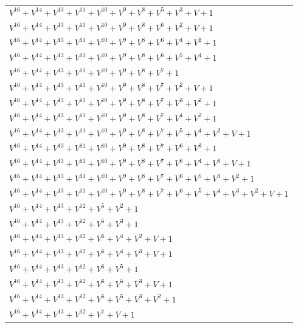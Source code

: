 \documentclass[12pt]{article}
\begin{document}
\begin{adjustwidth}{-4cm}{}
\begin{center}
\begin{longtable}{|l|}
$V^{16}  +V^{14}  +V^{13}  +V^{11}  +V^{10}  +V^{9}  +V^{8}  +V^{5}  +V^{3}  + V + 1$ \\
$V^{16}  +V^{14}  +V^{13}  +V^{11}  +V^{10}  +V^{9}  +V^{8}  +V^{6}  +V^{2}  + V + 1$ \\
$V^{16}  +V^{14}  +V^{13}  +V^{11}  +V^{10}  +V^{9}  +V^{8}  +V^{6}  +V^{4}  +V^{2}  + 1$ \\
$V^{16}  +V^{14}  +V^{13}  +V^{11}  +V^{10}  +V^{9}  +V^{8}  +V^{6}  +V^{5}  +V^{4}  + 1$ \\
$V^{16}  +V^{14}  +V^{13}  +V^{11}  +V^{10}  +V^{9}  +V^{8}  +V^{7}  + 1$ \\
$V^{16}  +V^{14}  +V^{13}  +V^{11}  +V^{10}  +V^{9}  +V^{8}  +V^{7}  +V^{2}  + V + 1$ \\
$V^{16}  +V^{14}  +V^{13}  +V^{11}  +V^{10}  +V^{9}  +V^{8}  +V^{7}  +V^{3}  +V^{2}  + 1$ \\
$V^{16}  +V^{14}  +V^{13}  +V^{11}  +V^{10}  +V^{9}  +V^{8}  +V^{7}  +V^{4}  +V^{2}  + 1$ \\
$V^{16}  +V^{14}  +V^{13}  +V^{11}  +V^{10}  +V^{9}  +V^{8}  +V^{7}  +V^{5}  +V^{4}  +V^{2}  + V + 1$ \\
$V^{16}  +V^{14}  +V^{13}  +V^{11}  +V^{10}  +V^{9}  +V^{8}  +V^{7}  +V^{6}  +V^{3}  + 1$ \\
$V^{16}  +V^{14}  +V^{13}  +V^{11}  +V^{10}  +V^{9}  +V^{8}  +V^{7}  +V^{6}  +V^{4}  +V^{3}  + V + 1$ \\
$V^{16}  +V^{14}  +V^{13}  +V^{11}  +V^{10}  +V^{9}  +V^{8}  +V^{7}  +V^{6}  +V^{5}  +V^{3}  +V^{2}  + 1$ \\
$V^{16}  +V^{14}  +V^{13}  +V^{11}  +V^{10}  +V^{9}  +V^{8}  +V^{7}  +V^{6}  +V^{5}  +V^{4}  +V^{3}  +V^{2}  + V + 1$ \\
$V^{16}  +V^{14}  +V^{13}  +V^{12}  +V^{5}  +V^{2}  + 1$ \\
$V^{16}  +V^{14}  +V^{13}  +V^{12}  +V^{5}  +V^{3}  + 1$ \\
$V^{16}  +V^{14}  +V^{13}  +V^{12}  +V^{6}  +V^{4}  +V^{2}  + V + 1$ \\
$V^{16}  +V^{14}  +V^{13}  +V^{12}  +V^{6}  +V^{4}  +V^{3}  + V + 1$ \\
$V^{16}  +V^{14}  +V^{13}  +V^{12}  +V^{6}  +V^{5}  + 1$ \\
$V^{16}  +V^{14}  +V^{13}  +V^{12}  +V^{6}  +V^{5}  +V^{3}  + V + 1$ \\
$V^{16}  +V^{14}  +V^{13}  +V^{12}  +V^{6}  +V^{5}  +V^{3}  +V^{2}  + 1$ \\
$V^{16}  +V^{14}  +V^{13}  +V^{12}  +V^{7}  + V + 1$ \\

\end{longtable}
\end{center}
\end{adjustwidth}
\end{document}
